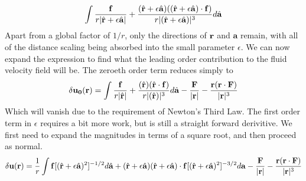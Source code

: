 \documentclass[11pt]{ucthesis}
\def\br{{\bf r}}
\def\ba{\mathbf{a}}
\begin{document}
{\begin{equation}
\int \frac{\bf f}{r|\hat{\br} + \epsilon \hat{ \mathbf{a}}|} + \frac{(\hat{\br} + \epsilon \hat{ \mathbf{a}}) ((\hat{\br} + \epsilon \hat{ \mathbf{a}}) \cdot  \mathbf{f})}{r|(\hat{\br} + \epsilon \hat{ \mathbf{a}})|^3} d\hat{ \mathbf{a}}
\end{equation}
Apart from a global factor of $1/r$, only the directions of $\br$ and $ \mathbf{a}$ remain, with all of the distance scaling being absorbed into the small parameter $\epsilon$. We can now expand the expression to find what the leading order contribution to the fluid velocity field will be.
The zeroeth order term reduces simply to
\begin{equation}
\label{eq:forcedensityzeroth}
\delta \mathbf{u_0}(\br) = \int \frac{\bf f}{r|\hat{\br}|} + \frac{(\hat{\br}) (\hat{\br} \cdot \mathbf{f})}{r|(\hat{\br})|^3} d\hat{\ba} - \frac{\bf F}{|\br|} - \frac{\br (\br \cdot \bf F)}{|\br|^3}
\end{equation}
Which will vanish due to the requirement of Newton's Third Law.
The first order term in $\epsilon$ requires a bit more work, but is still a straight forward derivitive. We first need to expand the magnitudes in terms of a square root, and then proceed as normal.
\begin{equation}
\label{eq:forcedensityfirst}
\delta \mathbf{u}(\br) = \frac{1}{r} \int  \mathbf{f}[(\hat{\br} + \epsilon\hat{\ba})^2]^{-1/2} d\hat{\ba} +(\hat{\br} + \epsilon\hat{\ba})(\hat{\br} + \epsilon\hat{\ba})\cdot \mathbf{f} [(\hat{\br} + \epsilon\hat{\ba})^2]^{-3/2} d\ba - \frac{\bf F}{|\br|} - \frac{\br (\br \cdot \mathbf{F})}{|\br|^3}
\end{equation}

}
\end{document}
